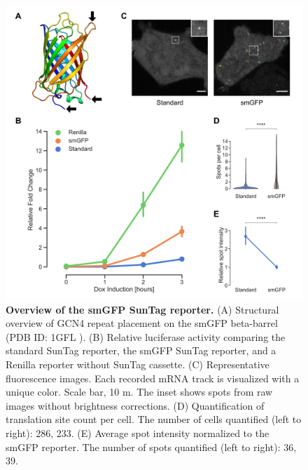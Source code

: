\begin{figure}[h]
    \centering
    \includegraphics[width=\linewidth]{images/figure6}
    \caption{\textbf{Overview of the smGFP SunTag reporter.}
        (A) Structural overview of GCN4 repeat placement on the smGFP beta-barrel (PDB ID: 1GFL \cite{yang_molecular_1996}).
        (B) Relative luciferase activity comparing the standard SunTag reporter,
            the smGFP SunTag reporter, and a Renilla reporter without SunTag cassette.
        (C) Representative fluorescence images. Each recorded mRNA track is 
            visualized with a unique color. Scale bar, 10 \textmu m.
            The inset shows spots from raw images without brightness corrections.
        (D) Quantification of translation site count per cell.
            The number of cells quantified (left to right): 286, 233.
        (E) Average spot intensity normalized to the smGFP reporter.
            The number of spots quantified (left to right): 36, 39.
    }
    \label{fig:spaghetti}
\end{figure}